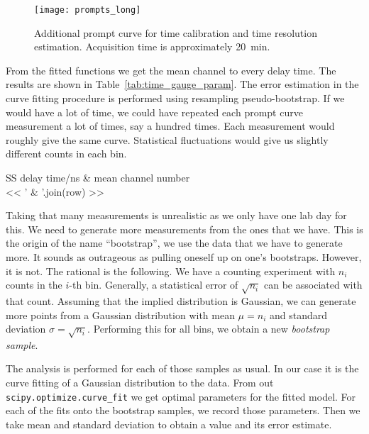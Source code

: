 \documentclass[11pt, english, fleqn, DIV=15, headinclude, BCOR=2cm]{scrreprt}
\begin{document}
\begin{figure}
    \centering
    \texttt{[image: prompts\_long]}
    \caption{%
        Additional prompt curve for time calibration and time
        resolution estimation. Acquisition time is approximately
        \SI{20}{\minute}.
    }
    \label{fig:prompts_long}
\end{figure}

From the fitted functions we get the mean channel to every delay time. The
results are shown in Table~\ref{tab:time_gauge_param}. The error estimation in
the curve fitting procedure is performed using resampling pseudo-bootstrap. If
we would have a lot of time, we could have repeated each prompt curve
measurement a lot of times, say a hundred times. Each measurement would roughly
give the same curve. Statistical fluctuations would give us slightly different
counts in each bin.

\begin{table}
        \centering
        \begin{tabular}{SS}
                \toprule
                {delay time/\si{\nano\second}}
                & {mean channel number} \\
                \midrule
                << ' & '.join(row) >> \\
                \bottomrule
        \end{tabular}
        \caption{%
                Mean channel number of Gauss fit width corresponding delay
                times.
        }
        \label{tab:time_gauge_param}
\end{table}

Taking that many measurements is unrealistic as we only have one lab day for
this. We need to generate more measurements from the ones that we have. This is
the origin of the name \enquote{bootstrap}, we use the data that we have to
generate more. It sounds as outrageous as pulling oneself up on one's
bootstraps. However, it is not. The rational is the following. We have a
counting experiment with $n_i$ counts in the $i$-th bin. Generally, a
statistical error of $\sqrt{n_i}$ can be associated with that count. Assuming
that the implied distribution is Gaussian, we can generate more points from a
Gaussian distribution with mean $\mu = n_i$ and standard deviation $\sigma =
\sqrt{n_i}$. Performing this for all bins, we obtain a new \emph{bootstrap
sample}.

The analysis is performed for each of those samples as usual. In our case it is
the curve fitting of a Gaussian distribution to the data. From out
\texttt{scipy.optimize.curve\_fit} we get optimal parameters for the fitted
model. For each of the fits onto the bootstrap samples, we record those
parameters. Then we take mean and standard deviation to obtain a value and its
error estimate.
\end{document}
